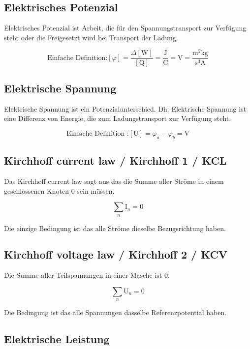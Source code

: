 \subsection{Elektrisches Potenzial}

Elektrisches Potenzial ist Arbeit, die für den Spannungstransport zur Verfügung steht oder die Freigesetzt wird bei Transport der Ladung. 

\[ \text{Einfache Definition:} [\varphi] = \frac{\Delta[\text{W}]}{[\text{Q}]} = \frac{\text{J}}{\text{C}} = \unit{\volt} = \frac{\unit{\square\meter\kilo\gram}}{\unit{\cubic\second\ampere}}\]

\subsection{Elektrische Spannung}

Elektrische Spannung ist ein Potenzialunterschied. 
Dh. Elektrische Spannung ist eine Differenz von Energie, die zum Ladungstransport zur Verfügung steht.

\[ \text{Einfache Definition :}[\text{U}] = \varphi_a - \varphi_b = \unit{\volt}   \]

\subsection{Kirchhoff current law / Kirchhoff 1 / KCL}

Das Kirchhoff current law sagt aus das die Summe aller Ströme in einem geschlossenen Knoten 0 sein müssen.

\[ \sum_{n} \text{I}_n = 0\]

Die einzige Bedingung ist das alle Ströme dieselbe Bezugsrichtung haben.

\begin{center}
    
\end{center}

\subsection{Kirchhoff voltage law / Kirchhoff 2 / KCV}

Die Summe aller Teilspannungen in einer Masche ist 0. 

\[ \sum_{n} \text{U}_n = 0\]

Die Bedingung ist das alle Spannungen dasselbe Referenzpotential haben.

\subsection{Elektrische Leistung}

